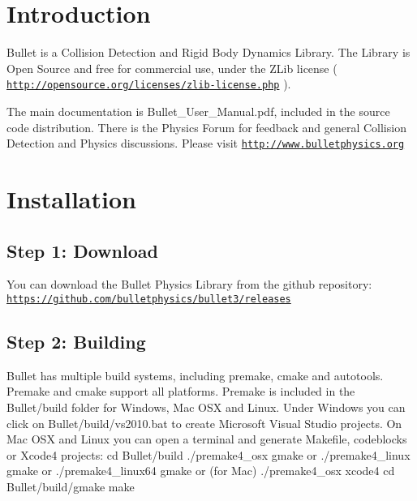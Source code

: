 \hypertarget{index_intro_sec}{}\section{Introduction}\label{index_intro_sec}
Bullet is a Collision Detection and Rigid Body Dynamics Library. The Library is Open Source and free for commercial use, under the ZLib license ( \href{http://opensource.org/licenses/zlib-license.php}{\tt http://opensource.org/licenses/zlib-license.php} ).

The main documentation is Bullet\_\-User\_\-Manual.pdf, included in the source code distribution. There is the Physics Forum for feedback and general Collision Detection and Physics discussions. Please visit \href{http://www.bulletphysics.org}{\tt http://www.bulletphysics.org}\hypertarget{index_install_sec}{}\section{Installation}\label{index_install_sec}
\hypertarget{index_step1}{}\subsection{Step 1: Download}\label{index_step1}
You can download the Bullet Physics Library from the github repository: \href{https://github.com/bulletphysics/bullet3/releases}{\tt https://github.com/bulletphysics/bullet3/releases}\hypertarget{index_step2}{}\subsection{Step 2: Building}\label{index_step2}
Bullet has multiple build systems, including premake, cmake and autotools. Premake and cmake support all platforms. Premake is included in the Bullet/build folder for Windows, Mac OSX and Linux. Under Windows you can click on Bullet/build/vs2010.bat to create Microsoft Visual Studio projects. On Mac OSX and Linux you can open a terminal and generate Makefile, codeblocks or Xcode4 projects: cd Bullet/build ./premake4\_\-osx gmake or ./premake4\_\-linux gmake or ./premake4\_\-linux64 gmake or (for Mac) ./premake4\_\-osx xcode4 cd Bullet/build/gmake make

